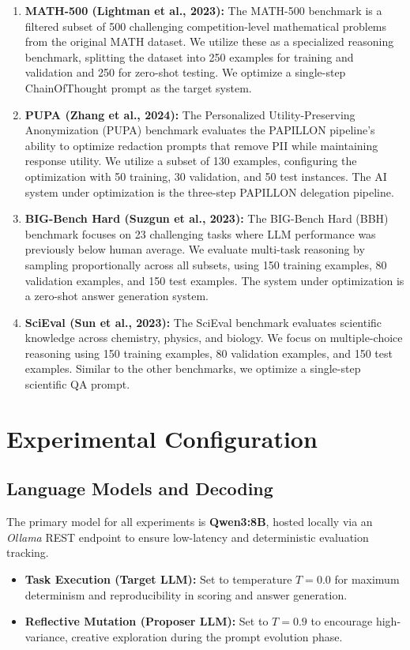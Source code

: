 \begin{enumerate}
    \item \textbf{MATH-500 (Lightman et al., 2023):} The MATH-500 benchmark is a filtered subset of 500 challenging competition-level mathematical problems from the original MATH dataset. We utilize these as a specialized reasoning benchmark, splitting the dataset into 250 examples for training and validation and 250 for zero-shot testing. We optimize a single-step ChainOfThought prompt as the target system.

    \item \textbf{PUPA (Zhang et al., 2024):} The Personalized Utility-Preserving Anonymization (PUPA) benchmark evaluates the PAPILLON pipeline's ability to optimize redaction prompts that remove PII while maintaining response utility. We utilize a subset of 130 examples, configuring the optimization with 50 training, 30 validation, and 50 test instances. The AI system under optimization is the three-step PAPILLON delegation pipeline.

    \item \textbf{BIG-Bench Hard (Suzgun et al., 2023):} The BIG-Bench Hard (BBH) benchmark focuses on 23 challenging tasks where LLM performance was previously below human average. We evaluate multi-task reasoning by sampling proportionally across all subsets, using 150 training examples, 80 validation examples, and 150 test examples. The system under optimization is a zero-shot answer generation system.

    \item \textbf{SciEval (Sun et al., 2023):} The SciEval benchmark evaluates scientific knowledge across chemistry, physics, and biology. We focus on multiple-choice reasoning using 150 training examples, 80 validation examples, and 150 test examples. Similar to the other benchmarks, we optimize a single-step scientific QA prompt.
\end{enumerate}

\section{Experimental Configuration}

\subsection{Language Models and Decoding}
The primary model for all experiments is \textbf{Qwen3:8B}, hosted locally via an \textit{Ollama} REST endpoint to ensure low-latency and deterministic evaluation tracking. 
\begin{itemize}
    \item \textbf{Task Execution (Target LLM):} Set to temperature $T=0.0$ for maximum determinism and reproducibility in scoring and answer generation.
    \item \textbf{Reflective Mutation (Proposer LLM):} Set to $T=0.9$ to encourage high-variance, creative exploration during the prompt evolution phase.
\end{itemize}

